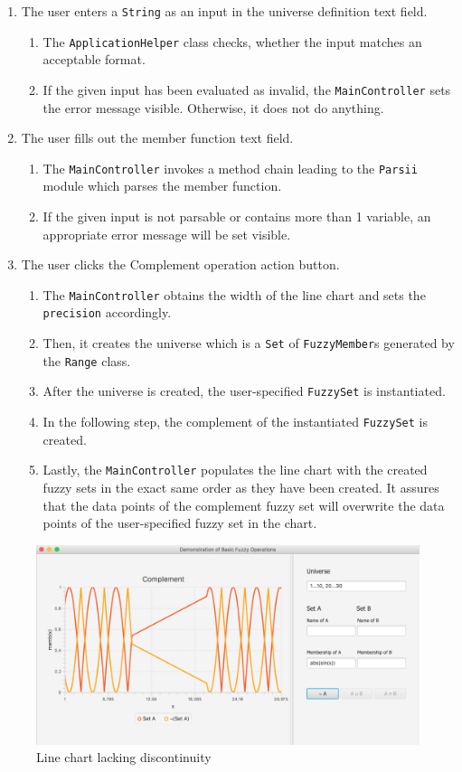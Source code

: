 \documentclass[12pt,a4paper,titlepage,final]{article}
\begin{document}
 \begin{enumerate}
 \item The user enters a \texttt{String} as an input in the universe definition text field.
 	\begin{enumerate}
 	\item The \verb|ApplicationHelper| class checks, whether the input matches an acceptable format.
 	\item If the given input has been evaluated as invalid, the \verb|MainController| sets the error message visible. Otherwise, it does not do anything.
 	\end{enumerate}
\item The user fills out the member function text field.
	\begin{enumerate}
	\item The \verb|MainController| invokes a method chain leading to the \texttt{Parsii} module which parses the member function.
	\item If the given input is not parsable or contains more than 1 variable, an appropriate error message will be set visible.
	\end{enumerate}
\item The user clicks the Complement operation action button.
	\begin{enumerate}
	\item The \verb|MainController| obtains the width of the line chart and sets the \texttt{precision} accordingly.
	\item Then, it creates the universe which is  a \verb|Set| of \verb|FuzzyMember|s generated by the \verb|Range| class.
	\item After the universe is created, the user-specified \verb|FuzzySet| is instantiated.
	\item In the following step, the complement of the instantiated \verb|FuzzySet| is created.
	\item Lastly, the \verb|MainController| populates the line chart with the created fuzzy sets in the exact same order as they have been created. It assures that the data points of the complement fuzzy set will overwrite the data points of the user-specified fuzzy set in the chart.
	\end{enumerate}
 \end{enumerate}
 
 \noindent
\begin{figure}[!h]
\centering
\includegraphics[width=1.0\textwidth]{img/discontinuous-ranges}
\caption{Line chart lacking discontinuity}
\label{fig:discontinuousRanges}
\end{figure}
\end{document}
